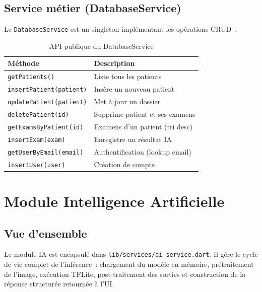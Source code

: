 \documentclass[12pt, a4paper]{report}
\begin{document}
\section{Service métier (DatabaseService)}

Le \texttt{DatabaseService} est un singleton implémentant les opérations CRUD~:

\begin{table}[H]
  \centering
  \renewcommand{\arraystretch}{1.3}
  \begin{tabularx}{\linewidth}{L{5.5cm} X}
    \toprule
    \textbf{Méthode} & \textbf{Description} \\
    \midrule
    \texttt{getPatients()} & Liste tous les patients \\
    \texttt{insertPatient(patient)} & Insère un nouveau patient \\
    \texttt{updatePatient(patient)} & Met à jour un dossier \\
    \texttt{deletePatient(id)} & Supprime patient et ses examens \\
    \texttt{getExamsByPatient(id)} & Examens d'un patient (tri desc) \\
    \texttt{insertExam(exam)} & Enregistre un résultat IA \\
    \texttt{getUserByEmail(email)} & Authentification (lookup email) \\
    \texttt{insertUser(user)} & Création de compte \\
    \bottomrule
  \end{tabularx}
  \caption{API publique du DatabaseService}
\end{table}

\chapter{Module Intelligence Artificielle}

\section{Vue d'ensemble}

Le module IA est encapsulé dans \texttt{lib/services/ai\_service.dart}. Il
gère le cycle de vie complet de l'inférence~: chargement du modèle en mémoire,
prétraitement de l'image, exécution TFLite, post-traitement des sorties et
construction de la réponse structurée retournée à l'UI.
\end{document}
